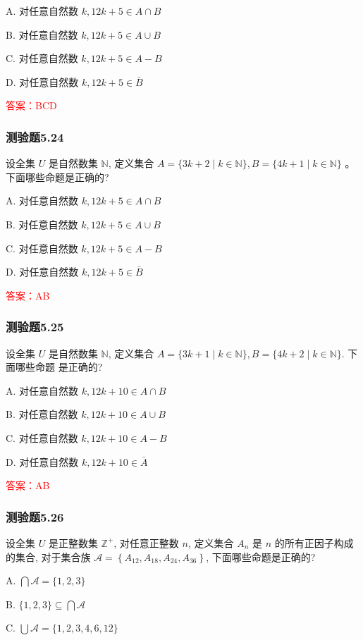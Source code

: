 \documentclass[UTF8, heading=true]{ctexart}
\begin{document}
A. 对任意自然数 $k, 12 k+5 \in A \cap B$

B. 对任意自然数 $k, 12 k+5 \in A \cup B$

C. 对任意自然数 $k, 12 k+5 \in A-B$

D. 对任意自然数 $k, 12 k+5 \in \bar{B}$

\textcolor{red}{答案：BCD}

\subsubsection{测验题5.24}

设全集 $U$ 是自然数集 $\mathbb{N}$, 定义集合 $A=\{3 k+2 \mid k \in \mathbb{N}\}, B=\{4 k+1 \mid k \in \mathbb{N}\}$ 。下面哪些命题是正确的?

A. 对任意自然数 $k, 12 k+5 \in A \cap B$

B. 对任意自然数 $k, 12 k+5 \in A \cup B$

C. 对任意自然数 $k, 12 k+5 \in A-B$

D. 对任意自然数 $k, 12 k+5 \in \bar{B}$

\textcolor{red}{答案：AB}

\subsubsection{测验题5.25}
设全集 $U$ 是自然数集 $\mathbb{N}$, 定义集合 $A=\{3 k+1 \mid k \in \mathbb{N}\}, B=\{4 k+2 \mid k \in \mathbb{N}\}$. 下面哪些命题
是正确的?

A. 对任意自然数 $k, 12 k+10 \in A \cap B$

B. 对任意自然数 $k, 12 k+10 \in A \cup B$

C. 对任意自然数 $k, 12 k+10 \in A-B$

D. 对任意自然数 $k, 12 k+10 \in \bar{A}$

\textcolor{red}{答案：AB}

\subsubsection{测验题5.26}

设全集 $U$ 是正整数集 $\mathbb{Z}^{+}$, 对任意正整数 $n$, 定义集合 $A_n$ 是 $n$ 的所有正因子构成的集合, 对于集合族 $\mathcal{A}=\left\{A_{12}, A_{18}, A_{24}, A_{36}\right\}$, 下面哪些命题是正确的?

A. $\bigcap \mathcal{A}=\{1,2,3\}$

B. $\{1,2,3\} \subseteq \bigcap \mathcal{A}$

C. $\bigcup \mathcal{A}=\{1,2,3,4,6,12\}$
\end{document}
